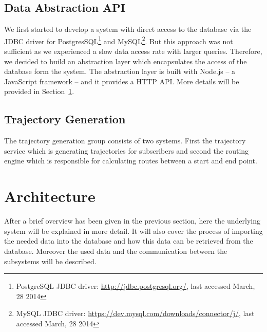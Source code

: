 \documentclass[master,english]{hgbthesis}
\begin{document}
\subsection{Data Abstraction API}
We first started to develop a system with direct access to the database via the JDBC driver for PostgresSQL\footnote{PostgreSQL JDBC driver: \url{http://jdbc.postgresql.org/}, last accessed March, 28 2014} and MySQL\footnote{MySQL JDBC driver: \url{https://dev.mysql.com/downloads/connector/j/}, last accessed March, 28 2014}. But this approach was not sufficient as we experienced a slow data access rate with larger queries. Therefore, we decided to build an abstraction layer which encapsulates the access of the database form the system. The abstraction layer is built with Node.js -- a JavaScript framework -- and it provides a HTTP API. More details will be provided in Section~\ref{sec:architecture}.
\subsection{Trajectory Generation}
The trajectory generation group consists of two systems. First the trajectory service which is generating trajectories for subscribers and second the routing engine which is responsible for calculating routes between a start and end point. 
\section{Architecture}
\label{sec:architecture}
After a brief overview has been given in the previous section, here the underlying system will be explained in more detail. It will also cover the process of importing the needed data into the database and how this data can be retrieved from the database. Moreover the used data and the communication between the subsystems will be described.
\end{document}

